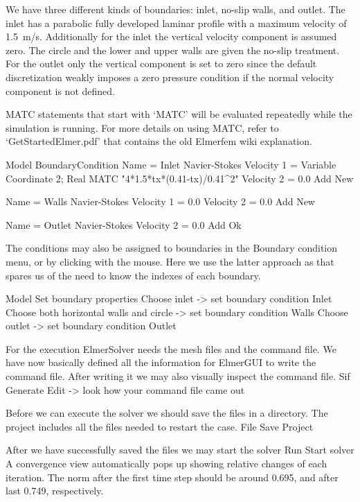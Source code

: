 We have three different kinds of boundaries: inlet, no-slip walls, and outlet. The inlet
has a parabolic fully developed laminar profile with a maximum velocity of 1.5~m/s.
Additionally for the inlet the vertical velocity component is assumed zero. 
The circle and the lower and upper walls are given the no-slip treatment.
For the outlet only the vertical component is set to zero since the default discretization
weakly imposes a zero pressure condition if the normal velocity component is not defined.

MATC statements that start with `MATC' will be evaluated repeatedly while the simulation
is running.  For more details on using MATC, refer to `GetStartedElmer.pdf' that contains
the old Elmerfem wiki explanation.

\ttbegin
Model
  BoundaryCondition
    Name = Inlet
    Navier-Stokes 
      Velocity 1 = Variable Coordinate 2; Real MATC "4*1.5*tx*(0.41-tx)/0.41^2"
      Velocity 2 = 0.0
    Add
    New

    Name = Walls
    Navier-Stokes 
      Velocity 1 = 0.0
      Velocity 2 = 0.0
    Add
    New

    Name = Outlet
    Navier-Stokes 
      Velocity 2 = 0.0
    Add 
    Ok
\ttend   

The conditions may also be assigned to boundaries in the Boundary condition menu, or 
by clicking with the mouse. Here we use the latter approach as that spares us of the 
need to know the indexes of each boundary.

\ttbegin
Model
  Set boundary properties
    Choose inlet -> set boundary condition Inlet
    Choose both horizontal walls and circle -> set boundary condition Walls
    Choose outlet -> set boundary condition Outlet
\ttend

For the execution 
ElmerSolver needs the mesh files and the command file. We have now basically defined
all the information for ElmerGUI to write the command file. After writing it we may also visually 
inspect the command file.
\ttbegin
Sif 
  Generate
  Edit -> look how your command file came out  
\ttend

Before we can execute the solver we should save the files in a directory. The project includes
all the files needed to restart the case.
\ttbegin
File 
  Save Project
\ttend

After we have successfully saved the files we may start the solver
\ttbegin
Run
  Start solver
\ttend
A convergence view automatically pops up showing relative changes of each iteration.
The norm after the first time step should be around 0.695, and after last 0.749, respectively.

